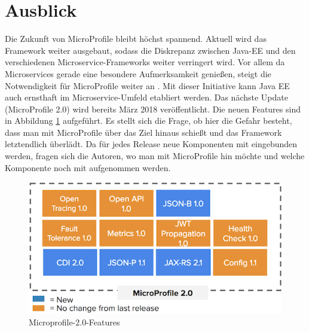 \section{Ausblick}
Die Zukunft von MicroProfile bleibt höchst spannend. Aktuell wird das Framework weiter ausgebaut, sodass die Diskrepanz zwischen Java-EE und den verschiedenen Microservice-Frameworks weiter verringert wird. Vor allem da Microservices gerade eine besondere Aufmerksamkeit genießen, steigt die Notwendigkeit für MicroProfile weiter an \cite{LarsRowekamp.2018}. Mit dieser Initiative kann Java EE auch ernsthaft im Microservice-Umfeld etabliert werden. Das nächste Update (MicroProfile 2.0) wird bereits März 2018 veröffentlicht. Die neuen Features sind in Abbildung \ref{fig:features2.0} aufgeführt. Es stellt sich die Frage, ob hier die Gefahr besteht, dass man mit MicroProfile über das Ziel hinaus schießt und das Framework letztendlich überlädt. Da für jedes Release neue Komponenten mit eingebunden werden, fragen sich die Autoren, wo man mit MicroProfile hin möchte und welche Komponente noch mit aufgenommen werden.

\begin{figure}[h!]
	\centering
	\includegraphics[width=1.0\linewidth]{images/Microprofile20}
	\caption{Microprofile-2.0-Features \cite{Microprofile.2017}} %
	\label{fig:features2.0}
\end{figure}

\ifCLASSOPTIONcaptionsoff
  \newpage
\fi